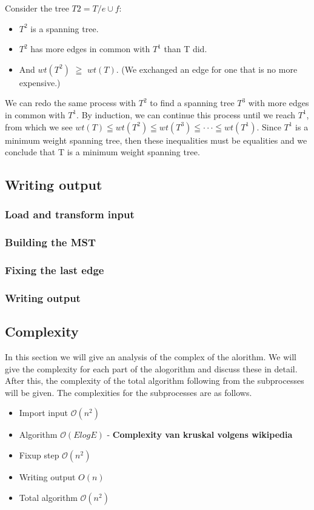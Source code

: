 \documentclass{article}
\newcommand{\bigO}[1]{\mathcal{O}(#1)}
\begin{document}
Consider the tree $T2 = T / {e}\cup{f}:$
\begin{itemize}
  \item $T^2$ is a spanning tree.
  \item $T^2$ has more edges in common with $T^1$ than T did.
  \item And $wt(T^2)$ $\geqq $ $wt(T)$. (We exchanged an edge for one that is no more expensive.)
\end{itemize}
We can redo the same process with $T^2$ to find a spanning tree $T^3$ with more edges in common with
$T^1$. By induction, we can continue this process until we reach $T^1$, from which we see
\newline
\newline
$wt (T) \leqq wt (T^2) \leqq wt (T^3) \leqq \cdot \cdot \cdot \leqq wt (T^1).$
\newline
\newline
Since $T^1$ is a minimum weight spanning tree, then these inequalities must be equalities and we
conclude that T is a minimum weight spanning tree.

\subsection{Writing output}

\subsubsection{Load and transform input}
\subsubsection{Building the MST}
\subsubsection{Fixing the last edge}
\subsubsection{Writing output}

\subsection{Complexity}
In this section we will give an analysis of the complex of the alorithm. We will give the complexity for each part of the alogorithm and discuss these in detail. After this, the complexity of the total algorithm following from the subprocesses will be given. The complexities for the subprocesses are as follows.
\begin{itemize}
  \item Import input $\bigO{n^2}$
  \item Algorithm $\bigO{E log E}$ - \textbf{Complexity van kruskal volgens wikipedia}
  \item Fixup step $\bigO{n^2}$
  \item Writing output $O(n)$
  \item Total algorithm $\bigO{n^2}$
\end{itemize}
\end{document}
